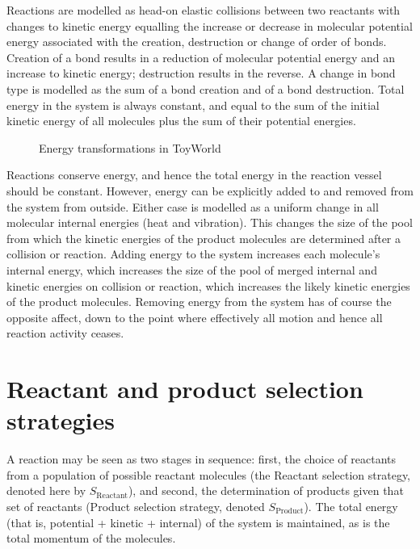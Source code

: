 Reactions are modelled as head-on elastic collisions between two
reactants with changes to kinetic energy equalling the increase or
decrease in molecular potential energy associated with the creation,
destruction or change of order of bonds. Creation of a bond results in a
reduction of molecular potential energy and an increase to kinetic
energy; destruction results in the reverse. A change in bond type is
modelled as the sum of a bond creation and of a bond destruction. Total
energy in the system is always constant, and equal to the sum of the
initial kinetic energy of all molecules plus the sum of their potential
energies.

\begin{figure}[t]
	\begin{center}
		\caption{Energy transformations in ToyWorld}
		\label{fig:energy_transformations}
	\end{center}
\end{figure}

Reactions conserve energy, and hence the total energy in the reaction
vessel should be constant. However, energy can be explicitly added to
and removed from the system from outside. Either case is modelled as a
uniform change in all molecular internal energies (heat and vibration).
This changes the size of the pool from which the kinetic energies of the
product molecules are determined after a collision or reaction. Adding
energy to the system increases each molecule's internal energy, which
increases the size of the pool of merged internal and kinetic energies
on collision or reaction, which increases the likely kinetic energies of
the product molecules. Removing energy from the system has of course the
opposite affect, down to the point where effectively all motion and
hence all reaction activity ceases.

\section{Reactant and product selection strategies}\label{reactant-and-product-selection-strategies}

A reaction may be seen as two stages in sequence: first, the choice of reactants from a population of possible reactant molecules (the Reactant selection strategy, denoted here by $S_\mathrm{Reactant}$), and second, the determination of products given that set of reactants (Product selection strategy, denoted $S_\mathrm{Product}$). The total energy (that is, potential + kinetic + internal) of the system is maintained, as is the total momentum of the molecules.

